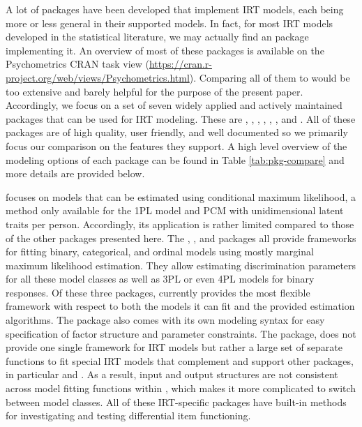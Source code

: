 \documentclass[jss]{jss}
\begin{document}
A lot of  packages have been developed that implement IRT
models, each being more or less general in their supported models. In
fact, for most IRT models developed in the statistical literature, we
may actually find an  package implementing it. An overview
of most of these packages is available on the Psychometrics CRAN task
view (\url{https://cran.r-project.org/web/views/Psychometrics.html}).
Comparing all of them to  would be too extensive and barely
helpful for the purpose of the present paper. Accordingly, we focus on a
set of seven widely applied and actively maintained packages that can be
used for IRT modeling. These are  \citep{eRm}, 
\citep{ltm},  \citep{TAM},  \citep{mirt}, 
\citep{sirt},  \citep{lme4}, and  \citep{lavaan}.
All of these packages are of high quality, user friendly, and well
documented so we primarily focus our comparison on the features they
support. A high level overview of the modeling options of each package
can be found in Table \ref{tab:pkg-compare} and more details are
provided below.

 focuses on models that can be estimated using conditional
maximum likelihood, a method only available for the 1PL model and PCM
with unidimensional latent traits per person. Accordingly, its
application is rather limited compared to those of the other packages
presented here. The , , and  packages all
provide frameworks for fitting binary, categorical, and ordinal models
using mostly marginal maximum likelihood estimation. They allow
estimating discrimination parameters for all these model classes as well
as 3PL or even 4PL models for binary responses. Of these three packages,
 currently provides the most flexible framework with respect
to both the models it can fit and the provided estimation algorithms.
The package also comes with its own modeling syntax for easy
specification of factor structure and parameter constraints. The
 package, does not provide one single framework for IRT models
but rather a large set of separate functions to fit special IRT models
that complement and support other packages, in particular  and
. As a result, input and output structures are not consistent
across model fitting functions within , which makes it more
complicated to switch between model classes. All of these IRT-specific
packages have built-in methods for investigating and testing
differential item functioning.
\end{document}
